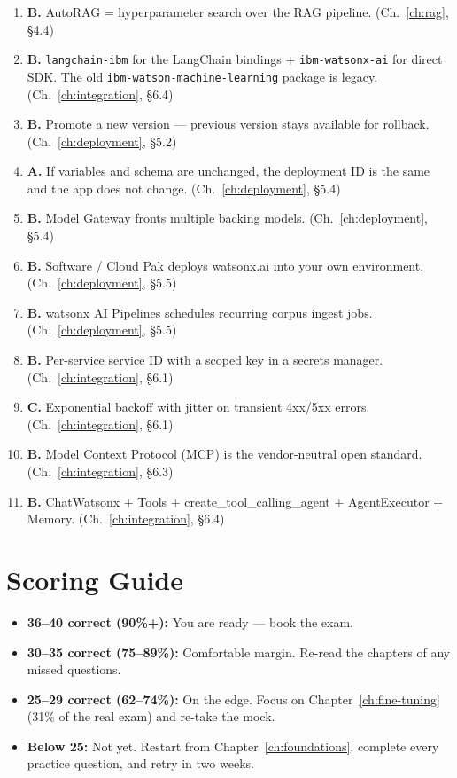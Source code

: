 \begin{enumerate}[leftmargin=*]
\item \textbf{B.} AutoRAG = hyperparameter search over the RAG pipeline. (Ch.\ \ref{ch:rag}, \S 4.4)
\item \textbf{B.} \texttt{langchain-ibm} for the LangChain bindings + \texttt{ibm-watsonx-ai} for direct SDK. The old \texttt{ibm-watson-machine-learning} package is legacy. (Ch.\ \ref{ch:integration}, \S 6.4)
\item \textbf{B.} Promote a new version --- previous version stays available for rollback. (Ch.\ \ref{ch:deployment}, \S 5.2)
\item \textbf{A.} If variables and schema are unchanged, the deployment ID is the same and the app does not change. (Ch.\ \ref{ch:deployment}, \S 5.4)
\item \textbf{B.} Model Gateway fronts multiple backing models. (Ch.\ \ref{ch:deployment}, \S 5.4)
\item \textbf{B.} Software / Cloud Pak deploys watsonx.ai into your own environment. (Ch.\ \ref{ch:deployment}, \S 5.5)
\item \textbf{B.} watsonx AI Pipelines schedules recurring corpus ingest jobs. (Ch.\ \ref{ch:deployment}, \S 5.5)
\item \textbf{B.} Per-service service ID with a scoped key in a secrets manager. (Ch.\ \ref{ch:integration}, \S 6.1)
\item \textbf{C.} Exponential backoff with jitter on transient 4xx/5xx errors. (Ch.\ \ref{ch:integration}, \S 6.1)
\item \textbf{B.} Model Context Protocol (MCP) is the vendor-neutral open standard. (Ch.\ \ref{ch:integration}, \S 6.3)
\item \textbf{B.} ChatWatsonx + Tools + create\_tool\_calling\_agent + AgentExecutor + Memory. (Ch.\ \ref{ch:integration}, \S 6.4)

\end{enumerate}

\section*{Scoring Guide}
\begin{itemize}[leftmargin=*]
    \item \textbf{36--40 correct (90\%+):} You are ready --- book the exam.
    \item \textbf{30--35 correct (75--89\%):} Comfortable margin. Re-read the chapters of any missed questions.
    \item \textbf{25--29 correct (62--74\%):} On the edge. Focus on Chapter~\ref{ch:fine-tuning} (31\% of the real exam) and re-take the mock.
    \item \textbf{Below 25:} Not yet. Restart from Chapter~\ref{ch:foundations}, complete every practice question, and retry in two weeks.
\end{itemize}

\cleardoublepage
